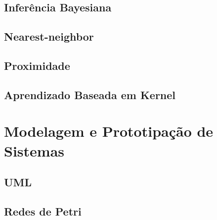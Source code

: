     \subsection{Inferência Bayesiana}
    \subsection{Nearest-neighbor}
    \subsection{Proximidade}
    \subsection{Aprendizado Baseada em Kernel}
\section{Modelagem e Prototipação de Sistemas}
    \subsection{UML}
    \subsection{Redes de Petri}